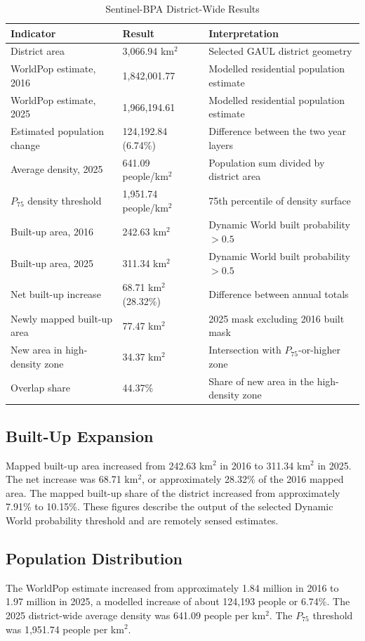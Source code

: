 \documentclass[conference]{IEEEtran}
\begin{document}
\begin{table}[!t]
\caption{Sentinel-BPA District-Wide Results}
\label{tab:results}
\centering
\footnotesize
\begin{tabular}{p{}p{}p{}}
\toprule
\textbf{Indicator}&\textbf{Result}&\textbf{Interpretation}\\
\midrule
District area&3,066.94 km$^2$&Selected GAUL district geometry\\
WorldPop estimate, 2016&1,842,001.77&Modelled residential population estimate\\
WorldPop estimate, 2025&1,966,194.61&Modelled residential population estimate\\
Estimated population change&124,192.84 (6.74\%)&Difference between the two year layers\\
Average density, 2025&641.09 people/km$^2$&Population sum divided by district area\\
$P_{75}$ density threshold&1,951.74 people/km$^2$&75th percentile of density surface\\
Built-up area, 2016&242.63 km$^2$&Dynamic World built probability $>0.5$\\
Built-up area, 2025&311.34 km$^2$&Dynamic World built probability $>0.5$\\
Net built-up increase&68.71 km$^2$ (28.32\%)&Difference between annual totals\\
Newly mapped built-up area&77.47 km$^2$&2025 mask excluding 2016 built mask\\
New area in high-density zone&34.37 km$^2$&Intersection with $P_{75}$-or-higher zone\\
Overlap share&44.37\%&Share of new area in the high-density zone\\
\bottomrule
\end{tabular}
\end{table}

\subsection{Built-Up Expansion}
Mapped built-up area increased from 242.63 km$^2$ in 2016 to 311.34 km$^2$ in 2025. The net increase was 68.71 km$^2$, or approximately 28.32\% of the 2016 mapped area. The mapped built-up share of the district increased from approximately 7.91\% to 10.15\%. These figures describe the output of the selected Dynamic World probability threshold and are remotely sensed estimates.

\subsection{Population Distribution}
The WorldPop estimate increased from approximately 1.84 million in 2016 to 1.97 million in 2025, a modelled increase of about 124,193 people or 6.74\%. The 2025 district-wide average density was 641.09 people per km$^2$. The $P_{75}$ threshold was 1,951.74 people per km$^2$.
\end{document}
